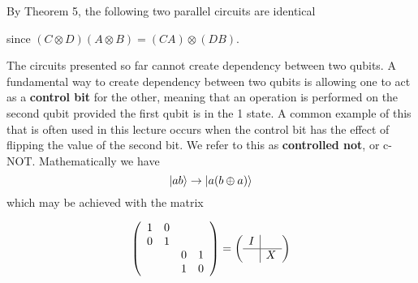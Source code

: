 \documentclass [12pt]{article}
\theoremstyle{definition}
\begin{document}
By Theorem 5, the following two parallel circuits are identical

\begin{center}
\end{center}

since $(C\otimes D)(A\otimes B) = (CA)\otimes (DB)$.

The circuits presented so far cannot create dependency between two qubits. A fundamental way to create dependency
between two qubits is allowing one to act as a \textbf{control bit} for the other, meaning that an operation is performed on the second qubit
provided the first qubit is in the 1 state. A common example of this that is often used in this lecture occurs when the control bit has the effect of 
flipping the value of the second bit. We refer to this as \textbf{controlled not}, or c-NOT. Mathematically we have 
\[\ket{ab}\rightarrow \ket{a(b\oplus a)}\]
which may be achieved with the matrix

\[
\left(\begin{array}{cccc}
1 & 0 & & \\
0 &  1 & &  \\
& & 0 & 1\\
& & 1 & 0\\
\end{array}\right)
=
\left(\begin{array}{c|c}
I & \\
\hline
 &  X \\
\end{array}\right)
\]
\end{document}

